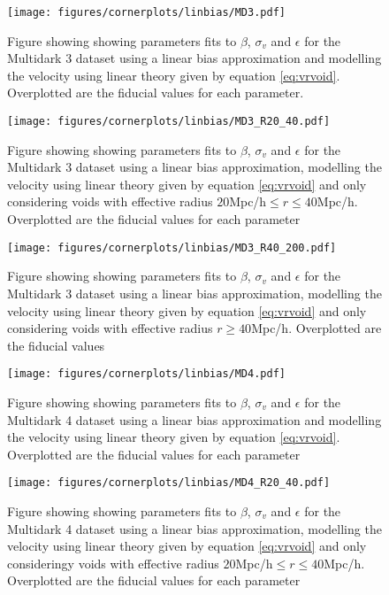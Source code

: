 \begin{figure}[htbp]\label{fig:linbiasMD3}
    \texttt{[image: figures/cornerplots/linbias/MD3.pdf]}
    \caption{Figure showing showing parameters fits to $\beta$, $\sigma_v$ and $\epsilon$ for the Multidark 3 dataset using a linear bias approximation and  modelling the velocity using linear theory given by equation \ref{eq:vrvoid}. Overplotted are the fiducial values for each parameter.}
\end{figure}

\begin{figure}[htbp]\label{fig:linbiasMD3R2040}
    \texttt{[image: figures/cornerplots/linbias/MD3\_R20\_40.pdf]}
    \caption{Figure showing showing parameters fits to $\beta$, $\sigma_v$ and $\epsilon$ for the Multidark 3 dataset using a linear bias approximation, modelling the velocity using linear theory given by equation \ref{eq:vrvoid} and only considering voids with effective radius $20$Mpc/h$\leq r \leq 40$Mpc/h. Overplotted are the fiducial values for each parameter}
\end{figure}

\begin{figure}[htbp]\label{fig:linbiasMD3R40}
    \texttt{[image: figures/cornerplots/linbias/MD3\_R40\_200.pdf]}
    \caption{Figure showing showing parameters fits to $\beta$, $\sigma_v$ and $\epsilon$ for the Multidark 3 dataset using a linear bias approximation, modelling the velocity using linear theory given by equation \ref{eq:vrvoid} and only considering voids with effective radius $r\geq 40$Mpc/h. Overplotted are the fiducial values}
\end{figure}

\begin{figure}[htbp]\label{fig:linbiasMD4}
    \texttt{[image: figures/cornerplots/linbias/MD4.pdf]}
    \caption{Figure showing showing parameters fits to $\beta$, $\sigma_v$ and $\epsilon$ for the Multidark 4 dataset using a linear bias approximation and  modelling the velocity using linear theory given by equation \ref{eq:vrvoid}.
    Overplotted are the fiducial values for each parameter}
\end{figure}

\begin{figure}[htbp]\label{fig:linbiasMD4R2040}
    \texttt{[image: figures/cornerplots/linbias/MD4\_R20\_40.pdf]}
    \caption{Figure showing showing parameters fits to $\beta$, $\sigma_v$ and $\epsilon$ for the Multidark 4 dataset using a linear bias approximation, modelling the velocity using linear theory given by equation \ref{eq:vrvoid} and only consideringy voids with effective radius $20$Mpc/h$\leq r \leq 40$Mpc/h. Overplotted are the fiducial values for each parameter}
\end{figure}

